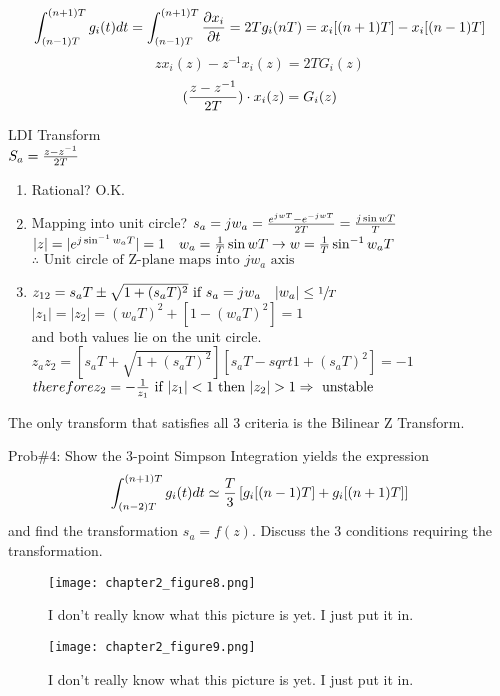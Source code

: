 \documentclass[11pt,fleqn]{book} %
\begin{document}
$$\int_{(n-1)T}^{(n+1)T}g_i(t)dt=\int_{(n-1)T}^{(n+1)T}{\partial x_i\over \partial t}=2Tg_i(nT)=x_i[(n+1)T]-x_i[(n-1)T]$$
$$zx_i(z)-z^{-1}x_i(z)=2TG_i(z)$$
$$({z-z^{-1}\over 2T})\cdot x_i(z)=G_i(z)$$
\begin{tcolorbox}
  LDI Transform\\
  $S_a={z-z^{-1}\over 2T}$
\end{tcolorbox}
\begin{enumerate}
 \item Rational? O.K.
 \item Mapping into unit circle? $s_a=jw_a={e^{jwT}-e^{-jwT}\over 2T}={j\sin wT\over T}$\\
 $|z|=|e^{j\sin^{-1}w_aT}|=1\quad w_a={1\over T}\sin wT\to w={1\over T}\sin^{-1}w_aT$\\
 $\therefore\text{ Unit circle of Z-plane maps into }jw_a\text{ axis }$\\
 \item $z_{12}=s_aT\pm\sqrt{1+(s_aT)^2}\text{ if }s_a=jw_a\quad|w_a|\leq\sfrac{1}{T}$\\
 $|z_1|=|z_2|=(w_aT)^2+[1-(w_aT)^2]=1$\\
 and both values lie on the unit circle.\\
 $z_az_2=[s_aT+\sqrt{1+(s_aT)^2}][s_aT-sqrt{1+(s_aT)^2}]=-1$\\
 $therefore z_2=-{1\over z_1}\text{ if }|z_1|<1\text{ then }|z_2|>1\Rightarrow\text{ unstable }$\\
\end{enumerate}


The only transform that satisfies all 3 criteria is the Bilinear Z Transform.
\begin{tcolorbox}
Prob\#4: Show the 3-point Simpson Integration yields the expression
$$\int_{(n-2)T}^{(n+1)T}g_i(t)dt\simeq{T\over 3}\left[g_i[(n-1)T]+g_i[(n+1)T]\right]$$
and find the transformation $s_a=f(z)$. Discuss the 3 conditions requiring the transformation.
\end{tcolorbox}

\begin{figure}[h]
  \centering\texttt{[image: chapter2\_figure8.png]}
  \caption{I don't really know what this picture is yet. I just put it in.}
\end{figure}

\begin{figure}[h]
  \centering\texttt{[image: chapter2\_figure9.png]}
  \caption{I don't really know what this picture is yet. I just put it in.}
\end{figure}
\end{document}
